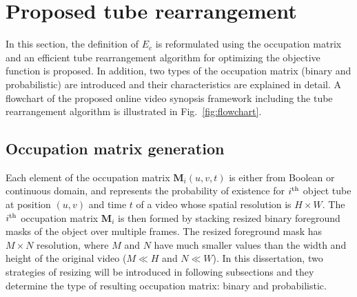 \documentclass[11pt]{hyu_thesis}
\begin{document}
\section{Proposed tube rearrangement}
\label{sec:proposed}
In this section, the definition of $E_c$ is reformulated using the occupation matrix and an efficient tube rearrangement algorithm for optimizing the objective function is proposed. In addition, two types of the occupation matrix (binary and probabilistic) are introduced and their characteristics are explained in detail. A flowchart of the proposed online video synopsis framework including the tube rearrangement algorithm is illustrated in Fig.~\ref{fig:flowchart}.

\subsection{Occupation matrix generation}
\label{sec:proposed:occ}
Each element of the occupation matrix $\textbf{M}_i (u,v,t)$ is either from Boolean or continuous domain, and represents the probability of existence for $i^{\rm{th}}$ object tube at position $(u,v)$ and time $t$ of a video whose spatial resolution is $H \times W$. The $i^{\rm{th}}$ occupation matrix $\textbf{M}_i$ is then formed by stacking resized binary foreground masks of the object over multiple frames. The resized foreground mask has $M \times N$ resolution, where $M$ and $N$ have much smaller values than the width and height of the original video ($M \ll H$ and $N \ll W$). In this dissertation, two strategies of resizing will be introduced in following subsections and they determine the type of resulting occupation matrix: binary and probabilistic.
\end{document}
